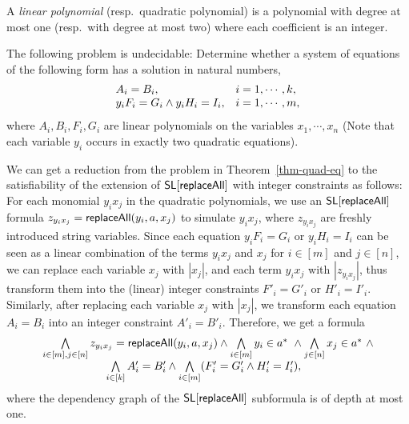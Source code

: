 \medskip

A \emph{linear polynomial} (resp.\ quadratic polynomial) is a polynomial with degree at most one (resp.\ with degree at most two) where each coefficient is an integer. %

\begin{theorem}[\cite{ID04}]\label{thm-quad-eq}
	The following problem is undecidable: Determine whether a system of equations of the following form has a solution in natural numbers, 
	\[
	\begin{array} {l l }
	A_i = B_i, & i =1, \cdots, k,\\
	y_iF_i=G_i \wedge y_i H_i = I_i, & i =1, \cdots, m, 
	\end{array}
	\] 
	where $A_i, B_i, F_i, G_i$ are linear polynomials on the variables $x_1,\cdots, x_n$ (Note that each variable $y_i$ occurs in exactly two quadratic equations).
\end{theorem}

We can get a reduction from the problem in Theorem~\ref{thm-quad-eq} to the satisfiability of the extension of $\mathsf{SL}[\mathsf{replaceAll}]$ with integer constraints as follows: For each monomial $y_i x_j$ in the quadratic polynomials, we use an $\mathsf{SL}[\mathsf{replaceAll}]$ formula $z_{y_i x_j} = \mathsf{replaceAll}(y_i, a, x_j)$ to simulate $y_i x_j$, where $z_{y_i x_j}$ are freshly introduced string variables. Since each equation $y_iF_i=G_i$ or $y_i H_i = I_i$ can be seen as a linear combination of the terms $y_i x_j$ and $x_j$ for $i \in [m]$ and $j \in [n]$, we can replace each variable $x_j$ with $|x_j|$, and each term $y_ix_j$ with $|z_{y_i x_j}|$,  thus transform them into the (linear) integer constraints $F'_i = G'_i$ or $H'_i = I'_i$. Similarly, after replacing each variable $x_j$ with $|x_j|$, we transform each equation $A_i= B_i$ into an integer constraint $A'_i = B'_i$. Therefore, we get a formula 
$$
\begin{array}{l c l }
\bigwedge \limits_{i \in [m], j \in [n]} z_{y_i x_j} = \replaceall(y_i, a, x_j) \wedge \bigwedge \limits_{i \in [m]} y_i \in a^*\ \wedge  \bigwedge \limits_{j \in [n]} x_j \in a^* \  \wedge\\
\hspace{2cm} \bigwedge \limits_{i \in [k]} A'_i = B'_i \wedge \bigwedge \limits_{i \in [m]} (F'_i = G'_i \wedge H'_i = I'_i),
\end{array}
$$
where the dependency graph of the $\mathsf{SL}[\mathsf{replaceAll}]$ subformula is of depth at most one.

